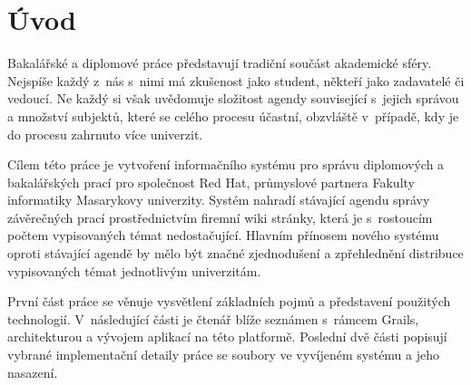 \chapter{Úvod}
Bakalářské a diplomové práce představují tradiční součást akademické sféry. Nejspíše každý z~nás s~nimi má zkušenost jako student, někteří jako zadavatelé či vedoucí. Ne každý si však uvědomuje složitost agendy související s~jejich správou a množství subjektů, které se celého procesu účastní, obzvláště v~případě, kdy je do procesu zahrnuto více univerzit.


Cílem této práce je vytvoření informačního systému pro správu diplomových a bakalářských prací pro společnost Red Hat, průmyslové partnera Fakulty informatiky Masarykovy univerzity. Systém nahradí stávající agendu správy závěrečných prací prostřednictvím firemní wiki stránky, která je s~rostoucím počtem vypisovaných témat nedostačující. Hlavním přínosem nového systému oproti stávající agendě by mělo být značné zjednodušení a zpřehlednění distribuce vypisovaných témat jednotlivým univerzitám.


První část práce se věnuje vysvětlení základních pojmů a představení použitých technologií. V~následující části je čtenář blíže seznámen s~rámcem Grails, architekturou a vývojem aplikací na této platformě. Poslední dvě části popisují vybrané implementační detaily práce se soubory ve vyvíjeném systému a jeho nasazení.
